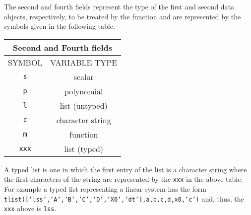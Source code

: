 The second
and fourth fields represent the type of the first and second data objects,
respectively, 
to be treated by the function and are represented by the symbols given
in the following table.

\begin{center}
\begin{tabular}{|c|c|}
\hline  
\multicolumn{2}{|c|}{Second and Fourth fields}
\\ \hline \hline
SYMBOL & VARIABLE TYPE
\\ \hline \hline

\verb!s! & scalar  \\ \hline

\verb!p! & polynomial \\ \hline

\verb!l! & list (untyped)  \\ \hline

\verb!c! & character string   \\ \hline

\verb!m! & function \\ \hline

\verb!xxx! & list (typed)  \\ \hline 
\end{tabular}
\end{center}

A typed list is one in which the first
entry of the list is a character string where the first
characters of the string are represented by the 
{\tt xxx} in the above table.  For example a typed list
representing a linear system has the form 
{\tt tlist(['lss','A','B','C','D','X0','dt'],a,b,c,d,x0,'c')} and, thus, the {\tt xxx}
above is {\tt lss}.

